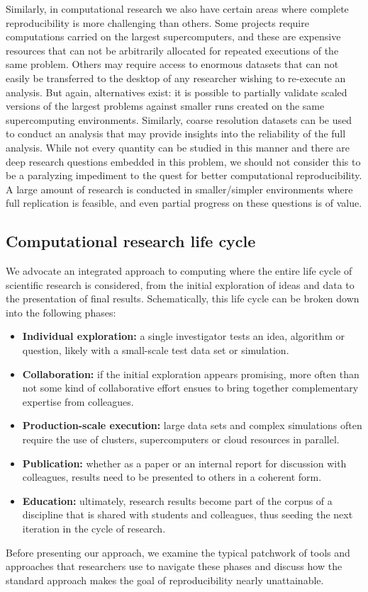 \documentclass[ChapterTOCs,krantz2]{krantz} %
\begin{document}
Similarly, in computational research we also have certain areas where complete
reproducibility is more challenging than others. Some projects require
computations carried on the largest supercomputers, and these are expensive
resources that can not be arbitrarily allocated for repeated executions of the
same problem. Others may require access to enormous datasets that can not
easily be transferred to the desktop of any researcher wishing to re-execute an
analysis.  But again, alternatives exist: it is possible to partially validate
scaled versions of the largest problems against smaller runs created on the
same supercomputing environments.  Similarly, coarse resolution datasets can be
used to conduct an analysis that may provide insights into the reliability of
the full analysis.  While not every quantity can be studied in this manner and
there are deep research questions embedded in this problem, we should not
consider this to be a paralyzing impediment to the quest for better
computational reproducibility.  A large amount of research is conducted in
smaller/simpler environments where full replication is feasible, and even
partial progress on these questions is of value.


\subsection{Computational research life cycle}

We advocate an integrated approach to computing where the entire
life cycle of scientific research is considered, from the initial exploration
of ideas and data to the presentation of final results.  Schematically, this
life cycle can be broken down into the following phases:

\begin{itemize}
\item \textbf{Individual exploration:} a single investigator tests an idea,
  algorithm or question, likely with a small-scale test data set or simulation.
\item \textbf{Collaboration:} if the initial exploration appears promising,
  more often than not some kind of collaborative effort ensues to bring
  together complementary expertise from colleagues.
\item \textbf{Production-scale execution:} large data sets and complex
  simulations often require the use of clusters, supercomputers or cloud
  resources in parallel.
\item \textbf{Publication:} whether as a paper or an internal report for
  discussion with colleagues, results need to be presented to others in a
  coherent form.
\item \textbf{Education:} ultimately, research results become part of the
  corpus of a discipline that is shared with students and colleagues, thus
  seeding the next iteration in the cycle of research.
\end{itemize}
Before presenting our approach, we examine the typical patchwork of tools and
approaches that researchers use to navigate these phases and discuss how the
standard approach makes the goal of reproducibility nearly unattainable.
\end{document}
